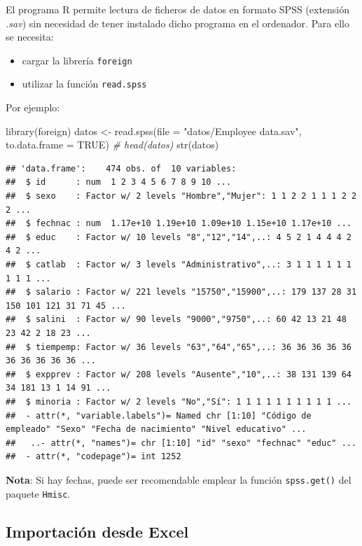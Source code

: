 \documentclass[
]{book}
\newenvironment{Shaded}{\begin{snugshade}}{\end{snugshade}}
\newcommand{\AttributeTok}[1]{\textcolor[rgb]{0.77,0.63,0.00}{#1}}
\newcommand{\CommentTok}[1]{\textcolor[rgb]{0.56,0.35,0.01}{\textit{#1}}}
\newcommand{\ConstantTok}[1]{\textcolor[rgb]{0.00,0.00,0.00}{#1}}
\newcommand{\FunctionTok}[1]{\textcolor[rgb]{0.00,0.00,0.00}{#1}}
\newcommand{\NormalTok}[1]{#1}
\newcommand{\OtherTok}[1]{\textcolor[rgb]{0.56,0.35,0.01}{#1}}
\newcommand{\StringTok}[1]{\textcolor[rgb]{0.31,0.60,0.02}{#1}}
\theoremstyle{break}
\theoremstyle{nonumberplain}
\begin{document}
El programa R permite
lectura de ficheros de datos en formato SPSS (extensión \emph{.sav}) sin
necesidad de tener instalado dicho programa en el ordenador. Para ello
se necesita:

\begin{itemize}
\item
  cargar la librería \texttt{foreign}
\item
  utilizar la función \texttt{read.spss}
\end{itemize}

Por ejemplo:

\begin{Shaded}
\begin{Highlighting}[]
\FunctionTok{library}\NormalTok{(foreign)}
\NormalTok{datos }\OtherTok{\textless{}{-}} \FunctionTok{read.spss}\NormalTok{(}\AttributeTok{file =} \StringTok{"datos/Employee data.sav"}\NormalTok{, }\AttributeTok{to.data.frame =} \ConstantTok{TRUE}\NormalTok{)}
\CommentTok{\# head(datos)}
\FunctionTok{str}\NormalTok{(datos)}
\end{Highlighting}
\end{Shaded}

\begin{verbatim}
## 'data.frame':    474 obs. of  10 variables:
##  $ id      : num  1 2 3 4 5 6 7 8 9 10 ...
##  $ sexo    : Factor w/ 2 levels "Hombre","Mujer": 1 1 2 2 1 1 1 2 2 2 ...
##  $ fechnac : num  1.17e+10 1.19e+10 1.09e+10 1.15e+10 1.17e+10 ...
##  $ educ    : Factor w/ 10 levels "8","12","14",..: 4 5 2 1 4 4 4 2 4 2 ...
##  $ catlab  : Factor w/ 3 levels "Administrativo",..: 3 1 1 1 1 1 1 1 1 1 ...
##  $ salario : Factor w/ 221 levels "15750","15900",..: 179 137 28 31 150 101 121 31 71 45 ...
##  $ salini  : Factor w/ 90 levels "9000","9750",..: 60 42 13 21 48 23 42 2 18 23 ...
##  $ tiempemp: Factor w/ 36 levels "63","64","65",..: 36 36 36 36 36 36 36 36 36 36 ...
##  $ expprev : Factor w/ 208 levels "Ausente","10",..: 38 131 139 64 34 181 13 1 14 91 ...
##  $ minoria : Factor w/ 2 levels "No","Sí": 1 1 1 1 1 1 1 1 1 1 ...
##  - attr(*, "variable.labels")= Named chr [1:10] "Código de empleado" "Sexo" "Fecha de nacimiento" "Nivel educativo" ...
##   ..- attr(*, "names")= chr [1:10] "id" "sexo" "fechnac" "educ" ...
##  - attr(*, "codepage")= int 1252
\end{verbatim}

\textbf{Nota}: Si hay fechas, puede ser recomendable emplear la función \texttt{spss.get()} del paquete \texttt{Hmisc}.

\hypertarget{importaciuxf3n-desde-excel}{%
\subsection{Importación desde Excel}\label{importaciuxf3n-desde-excel}}
\end{document}
